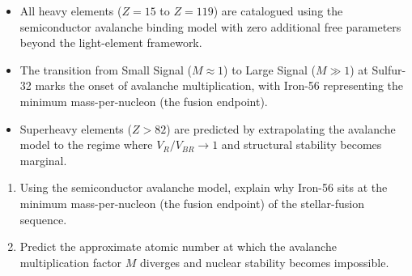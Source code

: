 \begin{summarybox}
\begin{itemize}
    \item All heavy elements ($Z = 15$ to $Z = 119$) are catalogued using the semiconductor avalanche binding model with zero additional free parameters beyond the light-element framework.
    \item The transition from Small Signal ($M \approx 1$) to Large Signal ($M \gg 1$) at Sulfur-32 marks the onset of avalanche multiplication, with Iron-56 representing the minimum mass-per-nucleon (the fusion endpoint).
    \item Superheavy elements ($Z > 82$) are predicted by extrapolating the avalanche model to the regime where $V_R/V_{BR} \to 1$ and structural stability becomes marginal.
\end{itemize}
\end{summarybox}

\begin{exercisebox}
\begin{enumerate}
    \item Using the semiconductor avalanche model, explain why Iron-56 sits at the minimum mass-per-nucleon (the fusion endpoint) of the stellar-fusion sequence.
    \item Predict the approximate atomic number at which the avalanche multiplication factor $M$ diverges and nuclear stability becomes impossible.
\end{enumerate}
\end{exercisebox}

